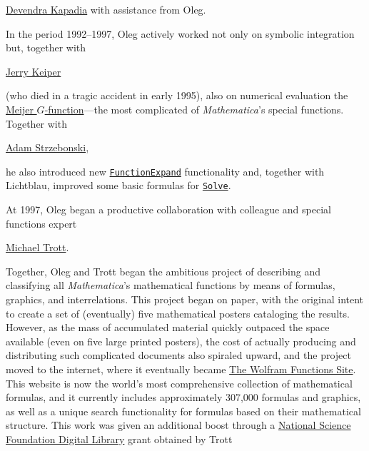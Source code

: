 \href{http://community.wolfram.com/web/dkapadia}{Devendra Kapadia} with assistance from Oleg.



In the period 1992–1997, Oleg actively worked not only on symbolic integration but, together with 

\href{http://www.stephenwolfram.com/publications/jerry-keiper/}{Jerry Keiper} 

(who died in a tragic accident in early 1995), also on numerical evaluation the \href{http://mathworld.wolfram.com/MeijerG-Function.html}{Meijer $G$-function}—the most complicated of \textit{Mathematica}'s special functions. Together with 

\href{http://members.wolfram.com/adams/}{Adam Strzebonski}, 

he also introduced new \href{http://reference.wolfram.com/language/ref/FunctionExpand.html}{\texttt{FunctionExpand}} functionality and, together with Lichtblau, improved some basic formulas for \href{http://reference.wolfram.com/language/ref/Solve.html}{\texttt{Solve}}.



At 1997, Oleg began a productive collaboration with colleague and special functions expert 

\href{http://community.wolfram.com/web/mtrott}{Michael Trott}. 

Together, Oleg and Trott began the ambitious project of describing and classifying all \textit{Mathematica}’s mathematical functions by means of formulas, graphics, and interrelations. This project began on paper, with the original intent to create a set of (eventually) five mathematical posters cataloging the results. However, as the mass of accumulated material quickly outpaced the space available (even on five large printed posters), the cost of actually producing and distributing such complicated documents also spiraled upward, and the project moved to the internet, where it eventually became \href{http://functions.wolfram.com/}{The Wolfram Functions Site}. This website is now the world's most comprehensive collection of mathematical formulas, and it currently includes approximately 307,000 formulas and graphics, as well as a unique search functionality for formulas based on their mathematical structure. This work was given an additional boost through a \href{https://nsdl.oercommons.org/}{National Science Foundation Digital Library} grant obtained by Trott


